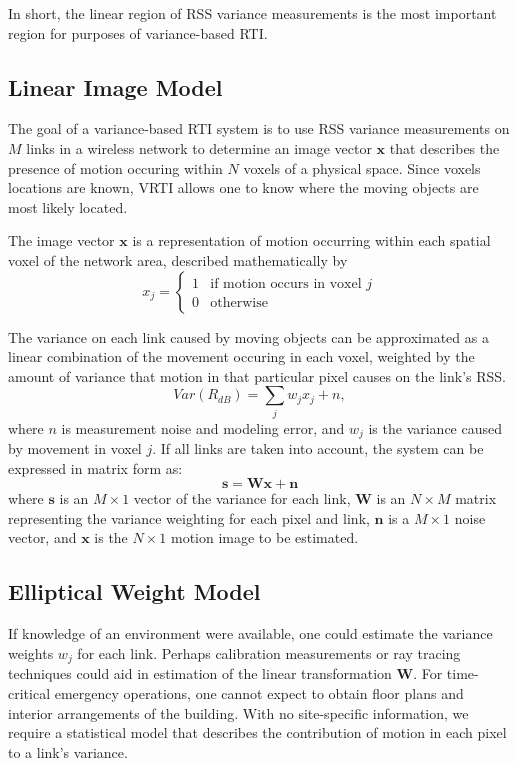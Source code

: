 \documentclass[journal]{IEEEtran}
\begin{document}
In short, the linear region of RSS variance measurements is the most important region for purposes of variance-based RTI.

\subsection{Linear Image Model}
The goal of a variance-based RTI system is to use RSS variance measurements on $M$ links in a wireless network to determine an image vector $\textbf{x}$ that describes the presence of motion occuring within $N$ voxels of a physical space. Since voxels locations are known, VRTI allows one to know where the moving objects are most likely located.

The image vector $\textbf{x}$ is a representation of motion occurring within each spatial voxel of the network area, described mathematically by
\begin{equation}
x_{j} = \left\{ {
\begin{array}{cc}
1 & \mbox{if motion occurs in voxel $j$} \\
0 & \mbox{otherwise} 
\end{array}}
\right .
\label{eq.x}
\end{equation} 

The variance on each link caused by moving objects can be approximated as a linear combination of the movement occuring in each voxel, weighted by the amount of variance that motion in that particular pixel causes on the link's RSS.
\begin{equation}
Var(R_{dB}) = \sum_j w_{j} x_j + n,
\end{equation}
where $n$ is measurement noise and modeling error, and $w_{j}$ is the variance caused by movement in voxel $j$. If all links are taken into account, the system can be expressed in matrix form as:
\begin{equation}
\textbf{s} = \textbf{Wx} + \textbf{n}
\label{eq.linearModel}
\end{equation}
where $\textbf{s}$ is an $M\times1$ vector of the variance for each link, $\textbf{W}$ is an $N \times M$ matrix representing the variance weighting for each pixel and link, $\textbf{n}$ is a $M\times1$ noise vector, and $\textbf{x}$ is the $N \times 1$ motion image to be estimated.

\subsection{Elliptical Weight Model}\label{section.Model.NEW}
If knowledge of an environment were available, one could estimate the variance weights $w_j$ for each link. Perhaps calibration measurements or ray tracing techniques could aid in estimation of the linear transformation $\textbf{W}$. For time-critical emergency operations, one cannot expect to obtain floor plans and interior arrangements of the building. With no site-specific information, we require a statistical model that describes the contribution of motion in each pixel to a link's variance.
\end{document}
